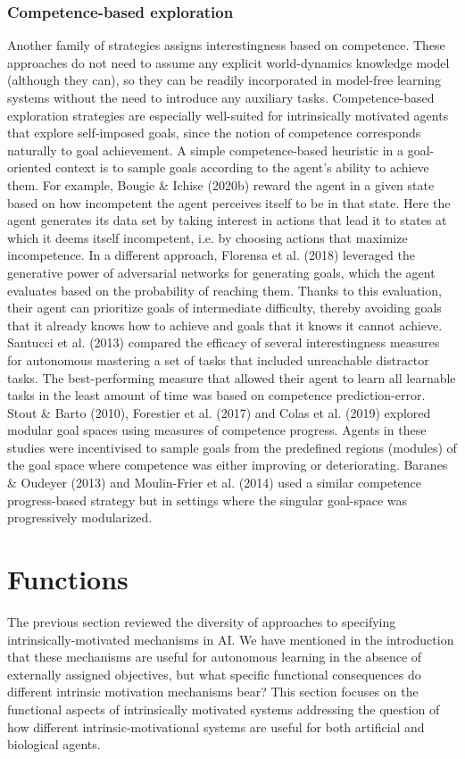 \subsubsection{Competence-based exploration}
Another family of strategies assigns interestingness based on competence. These approaches do not need to assume any explicit world-dynamics knowledge model (although they can), so they can be readily incorporated in model-free learning systems without the need to introduce any auxiliary tasks. Competence-based exploration strategies are especially well-suited for intrinsically motivated agents that explore self-imposed goals, since the notion of competence corresponds naturally to goal achievement. A simple competence-based heuristic in a goal-oriented context is to sample goals according to the agent’s ability to achieve them. For example, Bougie \& Ichise (2020b) reward the agent in a given state based on how incompetent the agent perceives itself to be in that state. Here the agent generates its data set by taking interest in actions that lead it to states at which it deems itself incompetent, i.e. by choosing actions that maximize incompetence. In a different approach, Florensa et al. (2018) leveraged the generative power of adversarial networks for generating goals, which the agent evaluates based on the probability of reaching them. Thanks to this evaluation, their agent can prioritize goals of intermediate difficulty, thereby avoiding goals that it already knows how to achieve and goals that it knows it cannot achieve. Santucci et al. (2013) compared the efficacy of several interestingness measures for autonomous mastering a set of tasks that included unreachable distractor tasks. The best-performing measure that allowed their agent to learn all learnable tasks in the least amount of time was based on competence prediction-error. Stout \& Barto (2010), Forestier et al. (2017) and Colas et al. (2019) explored modular goal spaces using measures of competence progress. Agents in these studies were incentivised to sample goals from the predefined regions (modules) of the goal space where competence was either improving or deteriorating. Baranes \& Oudeyer (2013) and Moulin-Frier et al. (2014) used a similar competence progress-based strategy but in settings where the singular goal-space was progressively modularized.

\section{Functions}\label{sec:3-functions}
The previous section reviewed the diversity of approaches to specifying intrinsically-motivated mechanisms in \ac{AI}.  We have mentioned in the introduction that these mechanisms are useful for autonomous learning in the absence of externally assigned objectives, but what specific functional consequences do different intrinsic motivation mechanisms bear?  This section focuses on the functional aspects of intrinsically motivated systems addressing the question of how different intrinsic-motivational systems are useful for both artificial and biological agents.  

